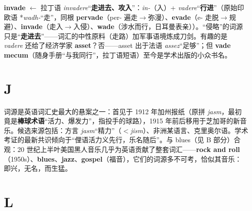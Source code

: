\documentclass[../main.tex]{subfiles}
\begin{document}
\begin{origin}
\textbf{invade} $\leftarrow$ 拉丁语 \textit{invadere}“\textbf{走进去、攻入}”：\textit{in-}（入）+ \textit{vadere}“\textbf{行进}”（原始印欧语 *\textit{wadh-}“走”，同根 \textbf{pervade}（per- 遍走$\to$弥漫）、\textbf{evade}（e- 走脱$\to$规避）、\textbf{invade}（走入$\to$入侵）、\textbf{wade}（涉水而行，日耳曼表亲））。“侵略”的词源只是“\textbf{走进去}”——词汇的中性原料（走路）加军事语境炼成刀剑。有趣的是 \textit{vadere} 还给了经济学家 \textbf{asset}？否——asset 出于法语 \textit{assez}“足够”；但 \textbf{vade mecum}（随身手册“与我同行”，拉丁语短语）至今是学术出版的小众书名。
\end{origin}

\section{J}



\begin{origin}
词源是英语词汇史最大的悬案之一：首见于 1912 年加州报纸（原拼 \textit{jasm}，最初竟是\textbf{棒球术语}“活力、爆发力”，指投手的球路），1915 年前后移用于芝加哥的新音乐。候选来源包括：方言 \textit{jasm}“精力”（$<$\textit{jism}）、非洲某语言、克里奥尔语。学术考证的最新共识倾向于“俚语活力义先行，乐名随后”。与 blues（见 B 部分）合观：20 世纪上半叶美国黑人音乐几乎为英语贡献了整套词汇——\textbf{rock and roll}（1950s）、\textbf{blues}、\textbf{jazz}、\textbf{gospel}（福音），它们的词源多不可考，恰似其音乐：即兴，无名，而生猛。
\end{origin}

\section{L}


\end{document}
